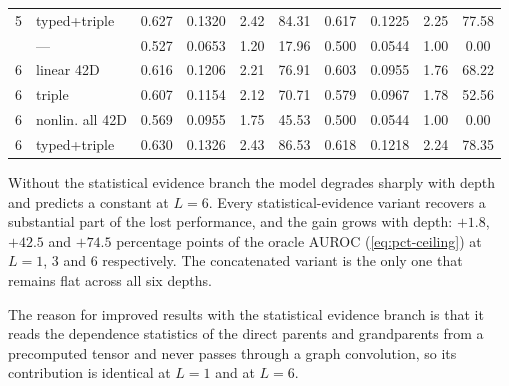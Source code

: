 \begin{table}[H]
\begin{tabular}{clcccccccc}
    5 & typed+triple     & 0.627 & 0.1320 & 2.42 & 84.31 & 0.617 & 0.1225 & 2.25 & 77.58 \\
    \addlinespace[4pt]
    6 & ---              & 0.527 & 0.0653 & 1.20 & 17.96 & 0.500 & 0.0544 & 1.00 &  0.00 \\
    6 & linear 42D       & 0.616 & 0.1206 & 2.21 & 76.91 & 0.603 & 0.0955 & 1.76 & 68.22 \\
    6 & triple           & 0.607 & 0.1154 & 2.12 & 70.71 & 0.579 & 0.0967 & 1.78 & 52.56 \\
    6 & nonlin. all 42D  & 0.569 & 0.0955 & 1.75 & 45.53 & 0.500 & 0.0544 & 1.00 &  0.00 \\
    6 & typed+triple     & 0.630 & 0.1326 & 2.43 & 86.53 & 0.618 & 0.1218 & 2.24 & 78.35 \\
    \bottomrule
  \end{tabular}
\end{table}

Without the statistical evidence branch the model degrades sharply with depth and predicts a constant at
$L=6$. Every statistical-evidence variant recovers a substantial part of the lost performance,
and the gain grows with depth: $+1.8$, $+42.5$ and $+74.5$ percentage points
of the oracle AUROC (\cref{eq:pct-ceiling}) at $L=1$, $3$ and $6$ respectively.
The concatenated
variant is the only one that remains flat across all six depths.

The reason for improved results with the statistical evidence branch is that it reads the
dependence statistics of the direct parents and grandparents from a precomputed tensor and
never passes through a graph convolution, so its contribution is identical at
$L=1$ and at $L=6$. 


